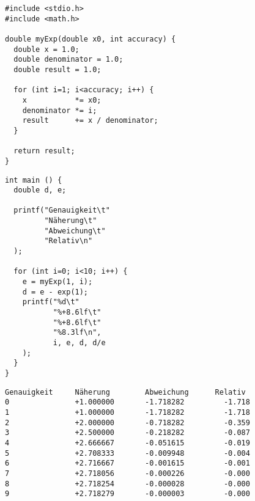 
\begin{frame}[fragile]
%
%
\begin{codebox}
\begin{verbatim}
#include <stdio.h>
#include <math.h>

double myExp(double x0, int accuracy) {
  double x = 1.0;
  double denominator = 1.0;
  double result = 1.0;

  for (int i=1; i<accuracy; i++) {
    x           *= x0;
    denominator *= i;
    result      += x / denominator;
  }
  
  return result;
}
\end{verbatim}
\end{codebox}
%
\begin{codebox}
\begin{verbatim}
int main () {
  double d, e;
  
  printf("Genauigkeit\t"
         "Näherung\t"
         "Abweichung\t"
         "Relativ\n"
  );
  
  for (int i=0; i<10; i++) {
    e = myExp(1, i);
    d = e - exp(1);
    printf("%d\t"
           "%+8.6lf\t"
           "%+8.6lf\t"
           "%8.3lf\n",
           i, e, d, d/e
    );
  }
}
\end{verbatim}
\end{codebox}
%
\end{frame}


\begin{frame}[fragile]
%
\begin{cmdbox}
\begin{verbatim}
Genauigkeit     Näherung        Abweichung      Relativ
0               +1.000000       -1.718282         -1.718
1               +1.000000       -1.718282         -1.718
2               +2.000000       -0.718282         -0.359
3               +2.500000       -0.218282         -0.087
4               +2.666667       -0.051615         -0.019
5               +2.708333       -0.009948         -0.004
6               +2.716667       -0.001615         -0.001
7               +2.718056       -0.000226         -0.000
8               +2.718254       -0.000028         -0.000
9               +2.718279       -0.000003         -0.000
\end{verbatim}
\end{cmdbox}
%
\end{frame}

